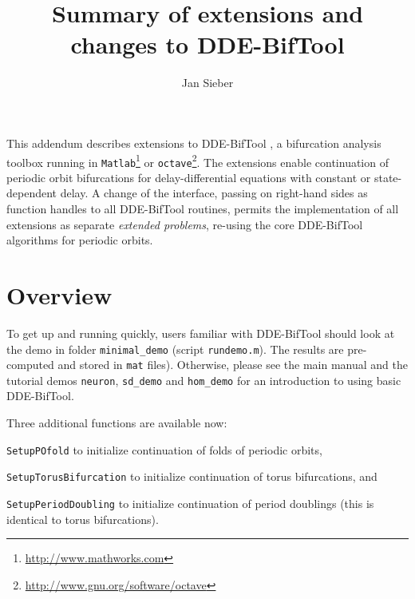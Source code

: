 \documentclass[11pt]{scrartcl}
\title{Summary of extensions and changes to DDE-BifTool}
\author{Jan Sieber}\date{}
\newcommand{\blist}[1]{\mbox{\lstinline!#1!}}
\begin{document}
\maketitle
\noindent This addendum describes extensions to DDE-BifTool
\cite{ELS01,ELR02,homoclinic,RS07,VLR08}, a bifurcation analysis toolbox
running in \texttt{Matlab}\footnote{\url{http://www.mathworks.com}} or
\texttt{octave}\footnote{\url{http://www.gnu.org/software/octave}}. The
extensions enable continuation of periodic orbit bifurcations for
delay-differential equations with constant or state-dependent delay. A
change of the interface, passing on right-hand sides as function
handles to all DDE-BifTool routines, permits the implementation of all
extensions as separate \emph{extended problems}, re-using the core
DDE-BifTool algorithms for periodic orbits.
\tableofcontents

\section{Overview}
\label{sec:quick}
To get up and running quickly, users familiar with DDE-BifTool should
look at the demo in folder \texttt{minimal\_demo} (script
\texttt{rundemo.m}). The results are pre-computed and stored in
\texttt{mat} files). Otherwise, please see the main manual and the
tutorial demos \texttt{neuron}, \texttt{sd\_demo} and \texttt{hom\_demo}
for an introduction to using basic DDE-BifTool.

\noindent Three additional functions are available now:
\begin{compactitem}
\item \blist{SetupPOfold} to initialize continuation of folds of periodic
  orbits,
\item \blist{SetupTorusBifurcation} to initialize continuation of
  torus bifurcations, and
\item \blist{SetupPeriodDoubling} to initialize
  continuation of period doublings (this is identical to torus
  bifurcations).
\end{compactitem}
\end{document}
